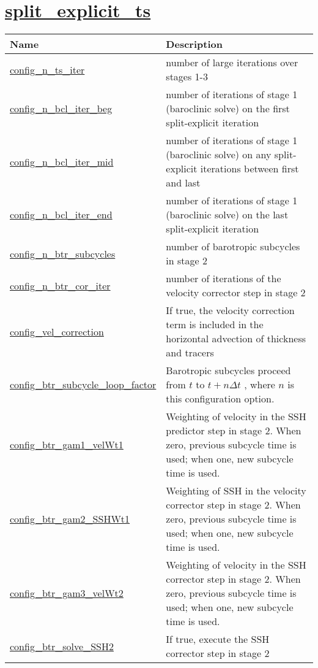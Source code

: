 \section[split\_explicit\_ts]{\hyperref[sec:nm_sec_split_explicit_ts]{split\_explicit\_ts}}
\label{sec:nm_tab_split_explicit_ts}

{\small
\begin{center}
\begin{longtable}{| p{2.0in} || p{4.0in} |}
	\hline
	{\bf Name} & {\bf Description} \\
	\hline
	\hline
	\hyperref[subsec:nm_sec_config_n_ts_iter]{config\_n\_ts\_iter} & number of large iterations over stages 1-3 \\
	\hline
	\hyperref[subsec:nm_sec_config_n_bcl_iter_beg]{config\_n\_bcl\_iter\_beg} & number of iterations of stage 1 (baroclinic solve) on the first split-explicit iteration \\
	\hline
	\hyperref[subsec:nm_sec_config_n_bcl_iter_mid]{config\_n\_bcl\_iter\_mid} & number of iterations of stage 1 (baroclinic solve) on any split-explicit iterations between first and last \\
	\hline
	\hyperref[subsec:nm_sec_config_n_bcl_iter_end]{config\_n\_bcl\_iter\_end} & number of iterations of stage 1 (baroclinic solve) on the last split-explicit iteration \\
	\hline
	\hyperref[subsec:nm_sec_config_n_btr_subcycles]{config\_n\_btr\_subcycles} & number of barotropic subcycles in stage 2 \\
	\hline
	\hyperref[subsec:nm_sec_config_n_btr_cor_iter]{config\_n\_btr\_cor\_iter} & number of iterations of the velocity corrector step in stage 2 \\
	\hline
	\hyperref[subsec:nm_sec_config_vel_correction]{config\_vel\_correction} & If true, the velocity correction term is included in the horizontal advection of thickness and tracers \\
	\hline
	\hyperref[subsec:nm_sec_config_btr_subcycle_loop_factor]{config\_btr\_subcycle\_loop\_factor} &  Barotropic subcycles proceed from  $t$  to  $t+n\Delta t$ , where  $n$  is this configuration option. \\
	\hline
	\hyperref[subsec:nm_sec_config_btr_gam1_velWt1]{config\_btr\_gam1\_velWt1} & Weighting of velocity in the SSH predictor step in stage 2.  When zero, previous subcycle time is used; when one, new subcycle time is used. \\
	\hline
	\hyperref[subsec:nm_sec_config_btr_gam2_SSHWt1]{config\_btr\_gam2\_SSHWt1} & Weighting of SSH in the velocity corrector step in stage 2.  When zero, previous subcycle time is used; when one, new subcycle time is used. \\
	\hline
	\hyperref[subsec:nm_sec_config_btr_gam3_velWt2]{config\_btr\_gam3\_velWt2} & Weighting of velocity in the SSH corrector step in stage 2.  When zero, previous subcycle time is used; when one, new subcycle time is used. \\
	\hline
	\hyperref[subsec:nm_sec_config_btr_solve_SSH2]{config\_btr\_solve\_SSH2} & If true, execute the SSH corrector step in stage 2 \\
	\hline
\end{longtable}
\end{center}
}
